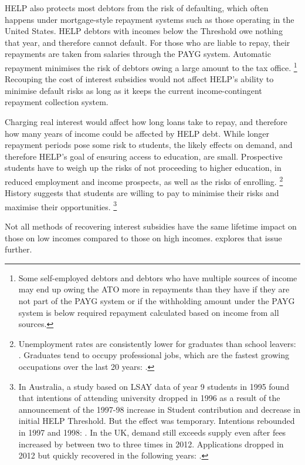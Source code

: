 \documentclass[embargoed]{grattan}
\begin{document}
\gls{HELP} also protects most debtors from the risk of defaulting, which often happens under mortgage-style repayment systems such as those operating in the United States.
\gls{HELP} debtors with incomes below the \gls{Threshold} owe nothing that year, and therefore cannot default.
For those who are liable to repay, their repayments are taken from salaries through the \gls{PAYG} system.
Automatic repayment minimises the risk of debtors owing a large amount to the tax office.%
\footnote{Some self-employed debtors and debtors who have multiple sources of income may end up owing the \gls{ATO} more in repayments than they have if they are not part of the \gls{PAYG} system or if the withholding amount under the \gls{PAYG} system is below required repayment calculated based on income from all sources.} Recouping the cost of interest subsidies would not affect \gls{HELP}'s ability to minimise default risks as long as it keeps the current income-contingent repayment collection system.

Charging real interest would affect how long loans take to repay, and therefore how many years of income could be affected by \gls{HELP} debt.
While longer repayment periods pose some risk to students, the likely effects on demand, and therefore \gls{HELP}'s goal of ensuring access to education, are small.
Prospective students have to weigh up the risks of not proceeding to higher education, in reduced employment and income prospects, as well as the risks of enrolling.%
\footnote{Unemployment rates are consistently lower for graduates than school leavers: \textcite[][Table 10]{Norton2016MappingAustralianhigher}.
Graduates tend to occupy professional jobs, which are the fastest growing occupations over the last 20 years: \textcite{ABS2015LabourforceAustralia}.} History suggests that students are willing to pay to minimise their risks and maximise their opportunities.%
\footnote{In Australia, a study based on LSAY data of year 9 students in 1995 found that intentions of attending university dropped in 1996 as a result of the announcement of the 1997-98 increase in \gls{Student contribution} and decrease in initial \gls{HELP} \gls{Threshold}.
But the effect was temporary.
Intentions rebounded in 1997 and 1998: \textcite[][505]{Chapman2005accessimplicationsincome}.
In the UK, demand still exceeds supply even after fees increased by between two to three times in 2012.
Applications dropped in 2012 but quickly recovered in the following years: \textcite[][Figures~4 and~27]{UCAS20152015endcycle}.}

Not all methods of recovering interest subsidies have the same lifetime impact on those on low incomes compared to those on high incomes.
 explores that issue further.
\end{document}

